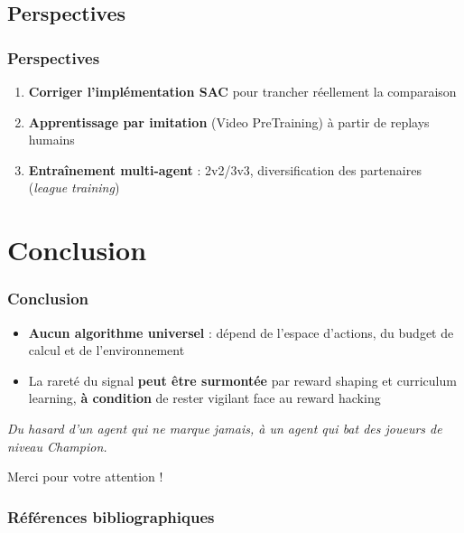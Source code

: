 \documentclass{beamer}
\begin{document}
\subsection{Perspectives}
\begin{frame}
\frametitle{Perspectives}

\begin{enumerate}
    \item \textbf{Corriger l'implémentation SAC} pour trancher
    réellement la comparaison
    \item \textbf{Apprentissage par imitation} (Video PreTraining) à
    partir de replays humains \nocite{bakerVideoPreTrainingVPT2022}
    \item \textbf{Entraînement multi-agent} : 2v2/3v3, diversification
    des partenaires (\emph{league training})
\end{enumerate}

\end{frame}


\section{Conclusion}
\begin{frame}
\frametitle{Conclusion}

\begin{itemize}
    \item \textbf{Aucun algorithme universel} : dépend de l'espace
    d'actions, du budget de calcul et de l'environnement
    \item La rareté du signal \textbf{peut être surmontée} par
    reward shaping et curriculum learning, \textbf{à condition} de rester
    vigilant face au reward hacking
\end{itemize}

\vspace{0.5cm}

\pause

\centering \textit{Du hasard d'un agent qui ne marque jamais, à un
agent qui bat des joueurs de niveau Champion.}

\end{frame}

\begin{frame}[plain]
    \vfill
    \centering
    \Huge Merci pour votre attention !
    \vfill
\end{frame}


\begin{frame}[allowframebreaks]
\frametitle{Références bibliographiques}
\printbibliography
\end{frame}
\end{document}

